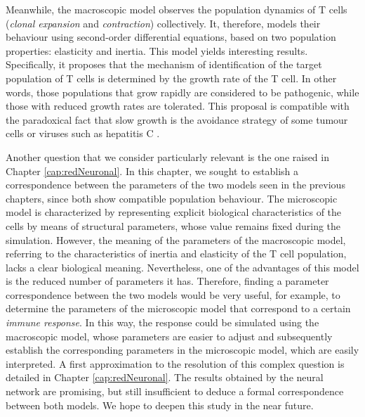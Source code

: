 Meanwhile, the macroscopic model observes the population dynamics of T cells (\textit{clonal expansion} and \textit{contraction}) collectively. It, therefore, models their behaviour using second-order differential equations, based on two population properties: elasticity and inertia. This model yields interesting results. Specifically, it proposes that the mechanism of identification of the target population of T cells is determined by the growth rate of the T cell. In other words, those populations that grow rapidly are considered to be pathogenic, while those with reduced growth rates are tolerated. This proposal is compatible with the paradoxical fact that slow growth is the avoidance strategy of some tumour cells or viruses such as hepatitis C \citep{Crawford39.17, pmid23596300}.


Another question that we consider particularly relevant is the one raised in Chapter \ref{cap:redNeuronal}. In this chapter, we sought to establish a correspondence between the parameters of the two models seen in the previous chapters, since both show compatible population behaviour. The microscopic model is characterized by representing explicit biological characteristics of the cells by means of structural parameters, whose value remains fixed during the simulation. However, the meaning of the parameters of the macroscopic model, referring to the characteristics of inertia and elasticity of the T cell population, lacks a clear biological meaning. Nevertheless, one of the advantages of this model is the reduced number of parameters it has. Therefore, finding a parameter correspondence between the two models would be very useful, for example, to determine the parameters of the microscopic model that correspond to a certain \textit{immune response}. In this way, the response could be simulated using the macroscopic model, whose parameters are easier to adjust and subsequently establish the corresponding parameters in the microscopic model, which are easily interpreted. A first approximation to the resolution of this complex question is detailed in Chapter \ref{cap:redNeuronal}. The results obtained by the neural network are promising, but still insufficient to deduce a formal correspondence between both models. We hope to deepen this study in the near future.


